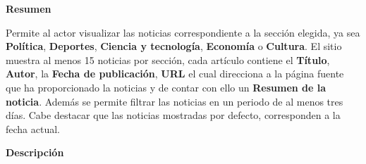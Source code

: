 

\begin{large}
	\textbf{Resumen}\\
\end{large}

Permite al actor visualizar las noticias correspondiente a la sección elegida, ya sea \textbf{Política}, \textbf{Deportes}, \textbf{Ciencia y tecnología}, \textbf{Economía} o \textbf{Cultura}. El sitio muestra al menos 15 noticias por sección, cada artículo contiene el \textbf{Título}, \textbf{Autor}, la \textbf{Fecha de publicación}, \textbf{URL} el cual direcciona a la página fuente que ha proporcionado la noticias y de contar con ello un \textbf{Resumen de la noticia}. Además se permite filtrar las noticias en un periodo de al menos tres días. Cabe destacar que las noticias mostradas por defecto, corresponden a la fecha actual.\\

\begin{large}
	\textbf{Descripción}\\
\end{large}



